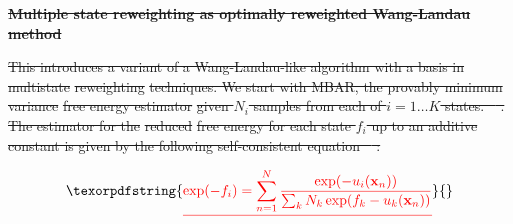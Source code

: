 \documentclass[9pt,review]{livecoms}
\newcommand{\vx}{\mathbf{x}}
\providecommand{\DIFdeltex}[1]{{\protect\color{red}\sout{#1}}}                      %
\providecommand{\DIFdelbegin}{} %
\providecommand{\DIFdel}[1]{\texorpdfstring{\DIFdeltex{#1}}{}} %
\newcommand{\DIFscaledelfig}{0.5}
\newlength{\DIFdelgraphicswidth} %
\newlength{\DIFdelgraphicsheight} %
\newcommand{\DIFdelincludegraphics}[2][]{%
\sbox{\DIFdelgraphicsbox}{\DIFOincludegraphics[#1]{#2}}%
\settoboxwidth{\DIFdelgraphicswidth}{\DIFdelgraphicsbox} %
\settoboxtotalheight{\DIFdelgraphicsheight}{\DIFdelgraphicsbox} %
\scalebox{\DIFscaledelfig}{%
\parbox[b]{\DIFdelgraphicswidth}{\usebox{\DIFdelgraphicsbox}\\[-\baselineskip] \rule{\DIFdelgraphicswidth}{0em}}\llap{\resizebox{\DIFdelgraphicswidth}{\DIFdelgraphicsheight}{%
\setlength{\unitlength}{\DIFdelgraphicswidth}%
\begin{picture}(1,1)%
\thicklines\linethickness{2pt} %
{\color[rgb]{1,0,0}\put(0,0){\framebox(1,1){}}}%
{\color[rgb]{1,0,0}\put(0,0){\line( 1,1){1}}}%
{\color[rgb]{1,0,0}\put(0,1){\line(1,-1){1}}}%
\end{picture}%
}\hspace*{3pt}}} %
} %
\DeclareRobustCommand{\DIFdelbegin}{\DIFOdelbegin \let\includegraphics\DIFdelincludegraphics} %
\begin{document}
\DIFdelbegin \textbf{\DIFdel{Multiple state reweighting as optimally reweighted Wang-Landau method}}

\DIFdel{This introduces a variant of a Wang-Landau-like algorithm with a basis in multistate }%
\DIFdel{reweighting}%
\DIFdel{techniques. We start with MBAR, the provably minimum variance }%
\DIFdel{free energy estimator}%
\DIFdel{given $N_{i}$ samples from each of $i=1 \ldots K$ states.
\mbox{%
\cite{shirts-chodera:jcp:2008:mbar}}\hspace{0pt}%
.  The estimator for the }%
\DIFdel{reduced}%
\DIFdel{free energy for each state $f_{i}$ up to an additive constant is given by the following self-consistent equation \mbox{%
\cite{shirts-chodera:jcp:2008:mbar}}\hspace{0pt}%
:
}%

\begin{align*}
\DIFdel{\exp(-f_i) = \sum_{n=1}^N \frac{\exp(-u_i(\vx_n))}{\sum_k N_k \exp(f_k-u_k(\vx_n))}
}\end{align*}
\end{document}
